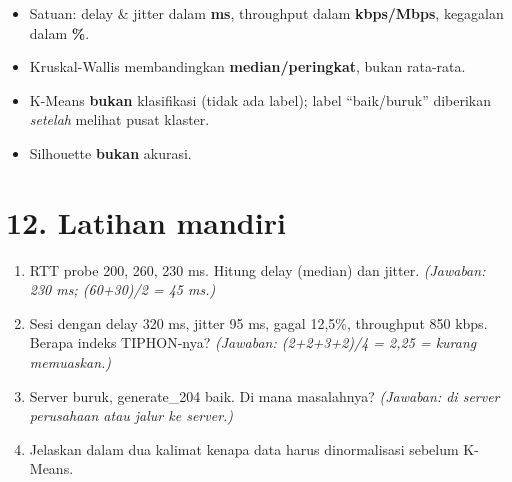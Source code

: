 \begin{awas}
\begin{itemize}
  \item Satuan: delay \& jitter dalam \textbf{ms}, throughput dalam \textbf{kbps/Mbps}, kegagalan dalam \textbf{\%}.
  \item Kruskal-Wallis membandingkan \textbf{median/peringkat}, bukan rata-rata.
  \item K-Means \textbf{bukan} klasifikasi (tidak ada label); label ``baik/buruk'' diberikan \textit{setelah} melihat pusat klaster.
  \item Silhouette \textbf{bukan} akurasi.
\end{itemize}
\end{awas}

\section*{12. Latihan mandiri}
\begin{enumerate}
  \item RTT probe 200, 260, 230 ms. Hitung delay (median) dan jitter. \textit{(Jawaban: 230 ms; (60+30)/2 = 45 ms.)}
  \item Sesi dengan delay 320 ms, jitter 95 ms, gagal 12,5\%, throughput 850 kbps. Berapa indeks TIPHON-nya? \textit{(Jawaban: (2+2+3+2)/4 = 2,25 = kurang memuaskan.)}
  \item Server buruk, generate\_204 baik. Di mana masalahnya? \textit{(Jawaban: di server perusahaan atau jalur ke server.)}
  \item Jelaskan dalam dua kalimat kenapa data harus dinormalisasi sebelum K-Means.
\end{enumerate}

